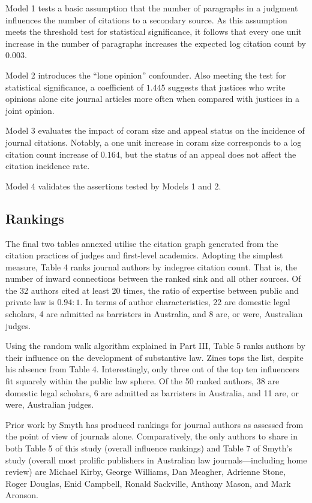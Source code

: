Model 1 tests a basic assumption that the number of paragraphs in a judgment influences the number of citations to a secondary source. As this assumption meets the threshold test for statistical significance, it follows that every one unit increase in the number of paragraphs increases the expected log citation count by $0.003$. 

Model 2 introduces the ``lone opinion'' confounder. Also meeting the test for statistical significance, a coefficient of $1.445$ suggests that justices who write opinions alone cite journal articles more often when compared with justices in a joint opinion. 

Model 3 evaluates the impact of coram size and appeal status on the incidence of journal citations. Notably, a one unit increase in coram size corresponds to a log citation count increase of $0.164$, but the status of an appeal does not affect the citation incidence rate. 

Model 4 validates the assertions tested by Models 1 and 2.

\subsection{Rankings}

The final two tables annexed utilise the citation graph generated from the citation practices of judges and first-level academics. Adopting the simplest measure, Table 4 ranks journal authors by indegree citation count. That is, the number of inward connections between the ranked sink and all other sources. Of the 32 authors cited at least 20 times, the ratio of expertise between public and private law is $0.94:1$. In terms of author characteristics, 22 are domestic legal scholars, 4 are admitted as barristers in Australia, and 8 are, or were, Australian judges.

Using the random walk algorithm explained in Part III, Table 5 ranks authors by their influence on the development of substantive law. Zines tops the list, despite his absence from Table 4. Interestingly, only three out of the top ten influencers fit squarely within the public law sphere. Of the 50 ranked authors, 38 are domestic legal scholars, 6 are admitted as barristers in Australia, and 11 are, or were, Australian judges. 

Prior work by Smyth has produced rankings for journal authors as assessed from the point of view of journals alone.\xn{} Comparatively, the only authors to share in both Table 5 of this study (overall influence rankings) and Table 7 of Smyth's study (overall most prolific publishers in Australian law journals---including home review) are Michael Kirby, George Williams, Dan Meagher, Adrienne Stone, Roger Douglas, Enid Campbell, Ronald Sackville, Anthony Mason, and Mark Aronson.\xn{}
